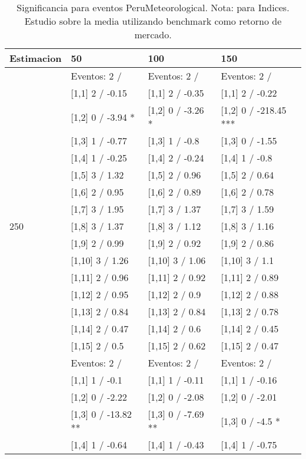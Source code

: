 \begin{table}

\caption{Significancia para eventos PeruMeteorological. Nota: para Indices. Estudio sobre la media utilizando benchmark como retorno de mercado.}
\centering
\begin{tabular}[t]{llll}
\toprule
Estimacion & 50 & 100 & 150\\
\midrule
 & Eventos:  2 / & Eventos:  2 / & Eventos:  2 /\\
 & {}[1,1] 2  / -0.15 & {}[1,1] 2  / -0.35 & {}[1,1] 2  / -0.22\\
 & {}[1,2] 0  / -3.94 * & {}[1,2] 0  / -3.26 * & {}[1,2] 0  / -218.45 ***\\
 & {}[1,3] 1  / -0.77 & {}[1,3] 1  / -0.8 & {}[1,3] 0  / -1.55\\
 & {}[1,4] 1  / -0.25 & {}[1,4] 2  / -0.24 & {}[1,4] 1  / -0.8\\
\addlinespace
 & {}[1,5] 3  / 1.32 & {}[1,5] 2  / 0.96 & {}[1,5] 2  / 0.64\\
 & {}[1,6] 2  / 0.95 & {}[1,6] 2  / 0.89 & {}[1,6] 2  / 0.78\\
 & {}[1,7] 3  / 1.95 & {}[1,7] 3  / 1.37 & {}[1,7] 3  / 1.59\\
250 & {}[1,8] 3  / 1.37 & {}[1,8] 3  / 1.12 & {}[1,8] 3  / 1.16\\
 & {}[1,9] 2  / 0.99 & {}[1,9] 2  / 0.92 & {}[1,9] 2  / 0.86\\
\addlinespace
 & {}[1,10] 3  / 1.26 & {}[1,10] 3  / 1.06 & {}[1,10] 3  / 1.1\\
 & {}[1,11] 2  / 0.96 & {}[1,11] 2  / 0.92 & {}[1,11] 2  / 0.89\\
 & {}[1,12] 2  / 0.95 & {}[1,12] 2  / 0.9 & {}[1,12] 2  / 0.88\\
 & {}[1,13] 2  / 0.84 & {}[1,13] 2  / 0.84 & {}[1,13] 2  / 0.78\\
 & {}[1,14] 2  / 0.47 & {}[1,14] 2  / 0.6 & {}[1,14] 2  / 0.45\\
\addlinespace
 & {}[1,15] 2  / 0.5 & {}[1,15] 2  / 0.62 & {}[1,15] 2  / 0.47\\
 & Eventos:  2 / & Eventos:  2 / & Eventos:  2 /\\
 & {}[1,1] 1  / -0.1 & {}[1,1] 1  / -0.11 & {}[1,1] 1  / -0.16\\
 & {}[1,2] 0  / -2.22 & {}[1,2] 0  / -2.08 & {}[1,2] 0  / -2.01\\
 & {}[1,3] 0  / -13.82 ** & {}[1,3] 0  / -7.69 ** & {}[1,3] 0  / -4.5 *\\
\addlinespace
 & {}[1,4] 1  / -0.64 & {}[1,4] 1  / -0.43 & {}[1,4] 1  / -0.75\\

\end{tabular}
\end{table}
